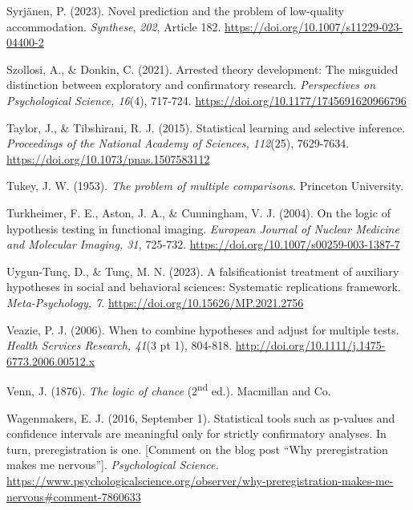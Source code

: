\documentclass[authordate, meta, issue]{jote-new-article}
\begin{document}
	Syrjänen, P. (2023). Novel prediction and the problem of low-quality accommodation. \emph{Synthese}, \emph{202}, Article 182. \url{https://doi.org/10.1007/s11229-023-04400-2}



	Szollosi, A., \& Donkin, C. (2021). Arrested theory development: The misguided distinction between exploratory and confirmatory research. \emph{Perspectives on Psychological Science, 16}(4), 717-724. \url{https://doi.org/10.1177/1745691620966796}



	Taylor, J., \& Tibshirani, R. J. (2015). Statistical learning and selective inference. \emph{Proceedings of the National Academy of Sciences, 112}(25), 7629-7634. \url{https://doi.org/10.1073/pnas.1507583112}



	Tukey, J. W. (1953). \emph{The problem of multiple comparisons.} Princeton University.



	Turkheimer, F. E., Aston, J. A., \& Cunningham, V. J. (2004). On the logic of hypothesis testing in functional imaging. \emph{European Journal of Nuclear Medicine and Molecular Imaging, 31, }725-732. \url{https://doi.org/10.1007/s00259-003-1387-7}



	Uygun-Tunç, D., \& Tunç, M. N. (2023). A falsificationist treatment of auxiliary hypotheses in social and behavioral sciences: Systematic replications framework. \emph{Meta-Psychology, 7}. \url{https://doi.org/10.15626/MP.2021.2756}



	Veazie, P. J. (2006). When to combine hypotheses and adjust for multiple tests. \emph{Health Services Research, 41}(3 pt 1), 804-818. \url{http://doi.org/10.1111/j.1475-6773.2006.00512.x}



	Venn, J. (1876). \emph{The logic of chance} (2\textsuperscript{nd} ed.). Macmillan and Co.



	Wagenmakers, E. J. (2016, September 1). Statistical tools such as p-values and confidence intervals are meaningful only for strictly confirmatory analyses. In turn, preregistration is one. [Comment on the blog post “Why preregistration makes me nervous”]. \emph{Psychological Science.} \url{https://www.psychologicalscience.org/observer/why-preregistration-makes-me-nervous\#comment-7860633}
\end{document}
